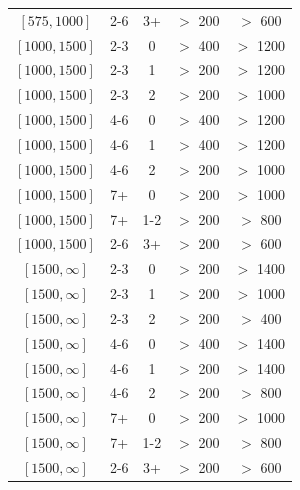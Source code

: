 \begin{table}
\begin{tabular}{c|c|c|c|c}
$[575,1000]$ &2-6&3+& $>$ 200& $>$ 600\\
$[1000,1500]$ &2-3&0& $>$ 400& $>$ 1200\\
$[1000,1500]$ &2-3&1& $>$ 200& $>$ 1200\\
$[1000,1500]$ &2-3&2& $>$ 200& $>$ 1000\\
$[1000,1500]$ &4-6&0& $>$ 400& $>$ 1200\\
$[1000,1500]$ &4-6&1& $>$ 400& $>$ 1200\\
$[1000,1500]$ &4-6&2& $>$ 200& $>$ 1000\\
$[1000,1500]$ &7+&0& $>$ 200& $>$ 1000\\
$[1000,1500]$ &7+&1-2& $>$ 200& $>$ 800\\
$[1000,1500]$ &2-6&3+& $>$ 200& $>$ 600\\
$[1500,\infty]$ &2-3&0& $>$ 200& $>$ 1400\\
$[1500,\infty]$ &2-3&1& $>$ 200& $>$ 1000\\
$[1500,\infty]$ &2-3&2& $>$ 200& $>$ 400\\
$[1500,\infty]$ &4-6&0& $>$ 400& $>$ 1400\\
$[1500,\infty]$ &4-6&1& $>$ 200& $>$ 1400\\
$[1500,\infty]$ &4-6&2& $>$ 200& $>$ 800\\
$[1500,\infty]$ &7+&0& $>$ 200& $>$ 1000\\
$[1500,\infty]$ &7+&1-2& $>$ 200& $>$ 800\\
$[1500,\infty]$ &2-6&3+& $>$ 200& $>$ 600\\
\hline \hline
	\end{tabular}
	\label{tbl:lostlepHybridPoint}
\end{table}

